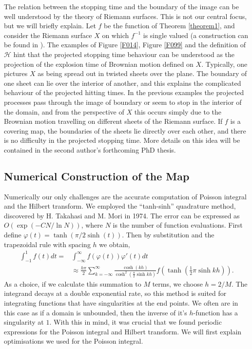 \documentclass[a4paper, oneside, 12pt]{amsart}
\renewcommand{\phi}{\varphi}
\newcommand{\mc}{\mathcal}
\newcommand{\fr}{\frac}
\begin{document}
The relation between the stopping time and the boundary of the image can be well understood by the theory of Riemann surfaces. This is not our central focus, but we will briefly explain. Let $f$ be the function of Theorem \ref{theorem1}, and consider the Riemann surface $X$ on which $f^{-1}$ is single valued (a construction can be found in \cite{ahlfors}). 
The examples of Figure \ref{F014}, Figure \ref{F099} and the definition of $\mc{H}$ hint that the projected stopping time behaviour can be understood as the projection
of the explosion time of Brownian motion defined on $X$. Typically, one pictures $X$ as being spread out in twisted sheets over the plane. The boundary of one sheet can lie over the interior of another, and this explains the complicated behaviour of the projected hitting times.
In the previous examples the projected processes pass through the image of boundary or seem to stop in the interior of the domain, and from the perspective of $X$ this occurs simply due to the Brownian motion travelling on different sheets of the Riemann surface. If $f$ is a covering map, the boundaries of the sheets lie directly over each other, and there is no difficulty in the projected stopping time. More details on this idea will be contained in the second author's forthcoming PhD thesis.

\subsection{Numerical Construction of the Map }
Numerically our only challenges are the accurate computation of Poisson integral and the Hilbert transform.
We employed the ``tanh-sinh'' quadrature method, discovered by H. Takahasi and M. Mori in 1974. The error can be expressed as $O(\exp(-CN/\ln N))$, where $N$ is the number of
function evaluations\cite{quad}. First define $\phi(t) = \tanh(\pi/2 \sinh(t))$. Then by substitution and the trapezoidal rule with spacing $h$ we obtain,
\begin{align*}
    \int_{-1}^1 f(t) dt =& \int_{-\infty}^{\infty} f(\phi(t)) \phi'(t) dt \\&\approx 
    \fr{h\pi}{2}\sum_{k=-\infty}^\infty \fr{\cosh(kh)}{\cosh^2(\fr{\pi}{2}\sinh kh)} f\left(\tanh(\fr{1}{2}\pi\sinh kh)\right).
\end{align*}
As a choice, if we calculate this summation to $M$ terms, we choose $h = 2/M$. 
The integrand decays at a double exponential rate, so this method is suited for integrating functions that have singularities at the end points. We often are in this case as if a domain is unbounded, 
then the inverse of it's $h$-function has a singularity at $1$. 
With this in mind, it was crucial that we found periodic expressions for the Poisson integral and Hilbert transform. We will first explain optimisations we used for the Poisson integral. 
\end{document}
